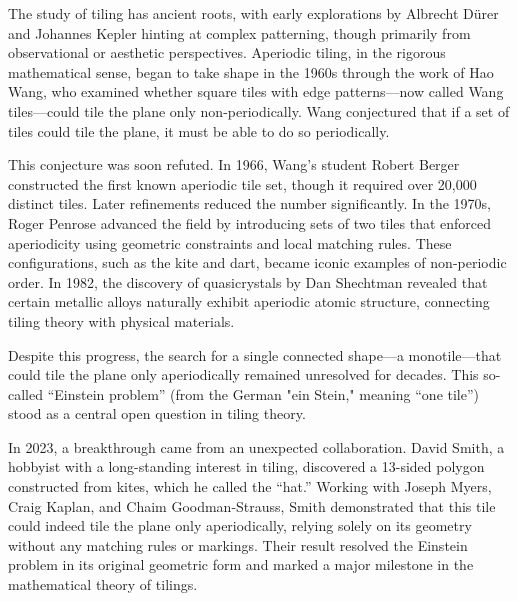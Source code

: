 \begin{historical}
The study of tiling has ancient roots, with early explorations by Albrecht Dürer and Johannes Kepler hinting at complex patterning, though primarily from observational or aesthetic perspectives. Aperiodic tiling, in the rigorous mathematical sense, began to take shape in the 1960s through the work of Hao Wang, who examined whether square tiles with edge patterns—now called Wang tiles—could tile the plane only non-periodically. Wang conjectured that if a set of tiles could tile the plane, it must be able to do so periodically.

This conjecture was soon refuted. In 1966, Wang’s student Robert Berger constructed the first known aperiodic tile set, though it required over 20,000 distinct tiles. Later refinements reduced the number significantly. In the 1970s, Roger Penrose advanced the field by introducing sets of two tiles that enforced aperiodicity using geometric constraints and local matching rules. These configurations, such as the kite and dart, became iconic examples of non-periodic order. In 1982, the discovery of quasicrystals by Dan Shechtman revealed that certain metallic alloys naturally exhibit aperiodic atomic structure, connecting tiling theory with physical materials.

Despite this progress, the search for a single connected shape—a monotile—that could tile the plane only aperiodically remained unresolved for decades. This so-called “Einstein problem” (from the German "ein Stein," meaning “one tile”) stood as a central open question in tiling theory.

In 2023, a breakthrough came from an unexpected collaboration. David Smith, a hobbyist with a long-standing interest in tiling, discovered a 13-sided polygon constructed from kites, which he called the “hat.” Working with Joseph Myers, Craig Kaplan, and Chaim Goodman-Strauss, Smith demonstrated that this tile could indeed tile the plane only aperiodically, relying solely on its geometry without any matching rules or markings. Their result resolved the Einstein problem in its original geometric form and marked a major milestone in the mathematical theory of tilings.
\end{historical}
